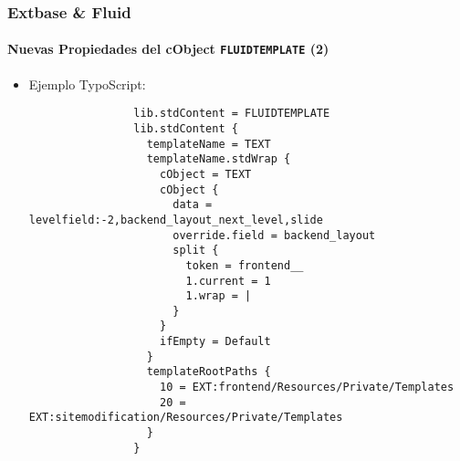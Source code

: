 \begin{frame}[fragile]
	\frametitle{Extbase \& Fluid}
	\framesubtitle{Nuevas Propiedades del cObject \texttt{FLUIDTEMPLATE} (2)}

	\lstset{basicstyle=\tiny\ttfamily}

	\begin{itemize}

		\item Ejemplo TypoScript:

			\begin{lstlisting}
				lib.stdContent = FLUIDTEMPLATE
				lib.stdContent {
				  templateName = TEXT
				  templateName.stdWrap {
				    cObject = TEXT
				    cObject {
				      data = levelfield:-2,backend_layout_next_level,slide
				      override.field = backend_layout
				      split {
				        token = frontend__
				        1.current = 1
				        1.wrap = |
				      }
				    }
				    ifEmpty = Default
				  }
				  templateRootPaths {
				    10 = EXT:frontend/Resources/Private/Templates
				    20 = EXT:sitemodification/Resources/Private/Templates
				  }
				}
			\end{lstlisting}

	\end{itemize}

\end{frame}


